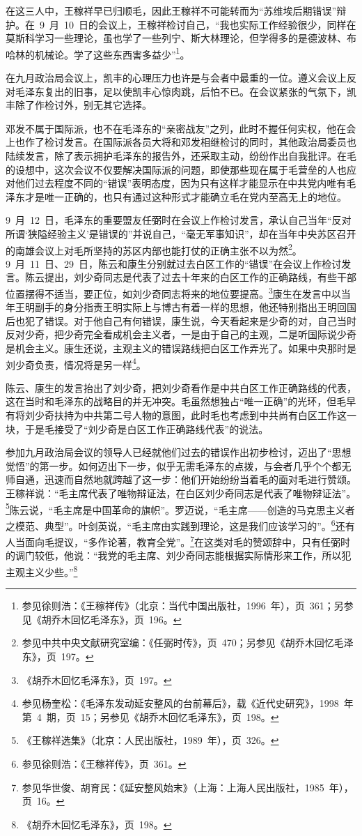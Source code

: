 在这三人中，王稼祥早已归顺毛，因此王稼祥不可能转而为“苏维埃后期错误”辩护。在~9~月~10~日的会议上，王稼祥检讨自己，“我也实际工作经验很少，同样在莫斯科学习一些理论，虽也学了一些列宁、斯大林理论，但学得多的是德波林、布哈林的机械论。学了这些东西害多益少”\footnote{参见徐则浩：《王稼祥传》（北京：当代中国出版社，1996~年），页~361；另参见《胡乔木回忆毛泽东》，页~196。}。

在九月政治局会议上，凯丰的心理压力也许是与会者中最重的一位。遵义会议上反对毛泽东复出的旧事，足以使凯丰心惊肉跳，后怕不已。在会议紧张的气氛下，凯丰除了作检讨外，别无其它选择。

邓发不属于国际派，也不在毛泽东的“亲密战友”之列，此时不握任何实权，他在会上也作了检讨发言。在国际派各员大将和邓发相继检讨的同时，其他政治局委员也陆续发言，除了表示拥护毛泽东的报告外，还采取主动，纷纷作出自我批评。在毛的设想中，这次会议不仅要解决国际派的问题，即使那些现在属于毛营垒的人也应对他们过去程度不同的“错误”表明态度，因为只有这样才能显示在中共党内唯有毛泽东才是唯一正确的，也只有通过这种形式才能确立毛在党内至高无上的地位。

9~月~12~日，毛泽东的重要盟友任弼时在会议上作检讨发言，承认自己当年“反对所谓‘狭隘经验主义’是错误的”并说自己，“毫无军事知识”，却在当年中央苏区召开的南雄会议上对毛所坚持的苏区内部也能打仗的正确主张不以为然\footnote{参见中共中央文献研究室编：《任弼时传》，页~470；另参见《胡乔木回忆毛泽东》，页~197。}。9~月~11~日、29~日，陈云和康生分别就过去白区工作的“错误”在会议上作检讨发言。陈云提出，刘少奇同志是代表了过去十年来的白区工作的正确路线，有些干部位置摆得不适当，要正位，如刘少奇同志将来的地位要提高。\footnote{《胡乔木回忆毛泽东》，页~197。}康生在发言中以当年王明副手的身分指责王明实际上与博古有着一样的思想，他还特别指出王明回国后也犯了错误。对于他自己有何错误，康生说，今天看起来是少奇的对，自己当时反对少奇，把少奇完全看成机会主义者，一是由于自己的主观，二是听国际说少奇是机会主义。康生还说，主观主义的错误路线把白区工作弄光了。如果中央那时是刘少奇负责，情况将是另一样\footnote{参见杨奎松：《毛泽东发动延安整风的台前幕后》，载《近代史研究》，1998~年第~4~期，页~15；另参见《胡乔木回忆毛泽东》，页~198。}。

陈云、康生的发言抬出了刘少奇，把刘少奇看作是中共白区工作正确路线的代表，这在当时和毛泽东的战略目的并无冲突。毛虽然想独占“唯一正确”的光环，但毛早有将刘少奇扶持为中共第二号人物的意图，此时毛也考虑到中共尚有白区工作这一块，于是毛接受了“刘少奇是白区工作正确路线代表”的说法。

参加九月政治局会议的领导人已经就他们过去的错误作出初步检讨，迈出了“思想觉悟”的第一步。如何迈出下一步，似乎无需毛泽东的点拨，与会者几乎个个都无师自通，迅速而自然地就跨越了这一步：他们开始纷纷当着毛的面对毛进行赞颂。王稼祥说：“毛主席代表了唯物辩证法，在白区刘少奇同志是代表了唯物辩证法”。\footnote{《王稼祥选集》（北京：人民出版社，1989~年），页~326。}陈云说，“毛主席是中国革命的旗帜”。罗迈说，“毛主席——创造的马克思主义者之模范、典型”。叶剑英说，“毛主席由实践到理论，这是我们应该学习的”。\footnote{参见徐则浩：《王稼祥传》，页~361。}还有人当面向毛提议，“多作论著，教育全党”。\footnote{参见华世俊、胡育民：《延安整风始末》（上海：上海人民出版社，1985~年），页~16。}在这类对毛的赞颂辞中，只有任弼时的调门较低，他说：“我党的毛主席、刘少奇同志能根据实际情形来工作，所以犯主观主义少些。”\footnote{《胡乔木回忆毛泽东》，页~198。}

